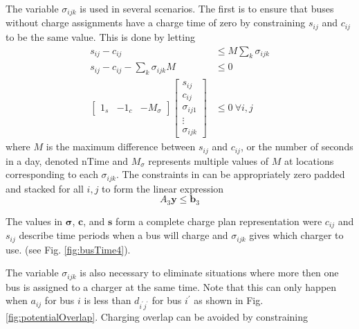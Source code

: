 	The variable $\sigma_{ijk}$ is used in several scenarios. The first is to ensure that buses without charge assignments have a charge time of zero by constraining $s_{ij}$ and $c_{ij}$ to be the same value. This is done by letting
	\begin{equation}\label{eqn:A3}\begin{aligned}
	s_{ij} - c_{ij} &\le M\sum_{k}\sigma_{ijk} \\
	s_{ij} - c_{ij} - \sum_{k}\sigma_{ijk}M &\le 0\\
	\begin{bmatrix} 1_s & -1_c & -M_{\sigma} \end{bmatrix}\begin{bmatrix}s_{ij} \\ c_{ij} \\ \sigma_{ij1} \\ \vdots \\ \sigma_{ijk} \end{bmatrix} &\le 0 \ \forall i,j 
\end{aligned} \end{equation}
	where $M$ is the maximum difference between $s_{ij}$ and $c_{ij}$, or the number of seconds in a day, denoted $\text{nTime}$ and $M_\sigma$ represents multiple values of $M$ at locations corresponding to each $\sigma_{ijk}$. The constraints in  can be appropriately zero padded and stacked for all $i,j$ to form the linear expression
	\begin{equation} 
		A_3\mathbf{y} \le \mathbf{b}_3
	\end{equation}
	\par The values in $\boldsymbol{\sigma}$, $\mathbf{c}$, and $\mathbf{s}$ form a complete charge plan representation were $c_{ij}$ and $s_{ij}$ describe time periods when a bus will charge and $\sigma_{ijk}$ gives which charger to use. (see Fig. \ref{fig:busTime4}).

The variable $\sigma_{ijk}$ is also necessary to eliminate situations where more then one bus is assigned to a charger at the same time. Note that this can only happen when $a_{ij}$ for bus $i$ is less than $d_{i^{'}j^{'}}$ for bus $i^{'}$ as shown in Fig. \ref{fig:potentialOverlap}. Charging overlap can be avoided by constraining


